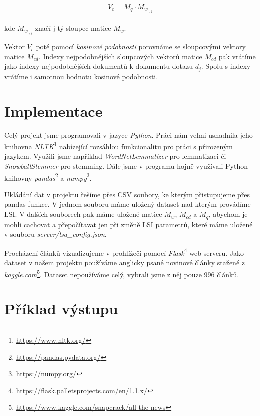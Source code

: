 \documentclass[11pt]{scrartcl} %
\begin{document}
\begin{align}
	\begin{split}
		V_c = M_q \cdot M_{w_{:,j}}
	\end{split}					
\end{align}

kde $M_{w_{:,j}}$ značí j-tý sloupec matice $M_w$.

\bigskip

Vektor $V_c$ poté pomocí \emph{kosinové podobnosti} porovnáme se sloupcovými vektory matice $M_{cd}$. Indexy nejpodobnějších sloupcových vektorů matice $M_{cd}$ pak vrátíme jako indexy nejpodobnějších dokumentů k dokumentu dotazu $d_j$. Spolu s indexy vrátíme i samotnou hodnotu kosinové podobnosti.

\section{Implementace}

Celý projekt jsme programovali v jazyce \emph{Python}. Práci nám velmi usnadnila jeho knihovna \emph{NLTK}\footnote{\url{https://www.nltk.org/}} nabízející rozsáhlou funkcionalitu pro práci s přirozeným jazykem. Využili jsme například \emph{WordNetLemmatizer} pro lemmatizaci či \emph{SnowballStemmer} pro stemming. Dále jsme v programu hojně využívali Python knihovny \emph{pandas}\footnote{\url{https://pandas.pydata.org/}} a \emph{numpy}\footnote{\url{https://numpy.org/}}.

\bigskip

Ukládání dat v projektu řešíme přes CSV soubory, ke kterým přistupujeme přes pandas funkce. V jednom souboru máme uložený dataset nad kterým provádíme LSI. V dalších souborech pak máme uložené matice $M_w$, $M_{cd}$ a $M_q$, abychom je mohli cachovat a přepočítavat jen při změně LSI parametrů, které máme uložené v souboru \emph{server/lsa\_config.json}.

\bigskip

Procházení článků vizualizujeme v prohlížeči pomocí \emph{Flask}\footnote{\url{https://flask.palletsprojects.com/en/1.1.x/}} web serveru. Jako dataset v našem projektu používáme anglicky psané novinové články stažené z \emph{kaggle.com}\footnote{\url{https://www.kaggle.com/snapcrack/all-the-news}}. Dataset nepoužíváme celý, vybrali jsme z něj pouze 996 článků.

\section{Příklad výstupu}
\end{document}
